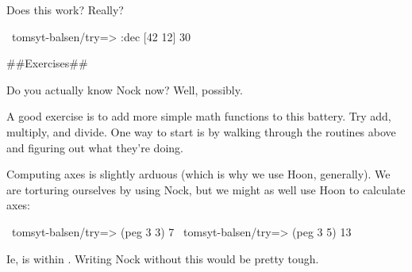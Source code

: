 Does this work?  Really?

\begin{code}
~tomsyt-balsen/try=> :dec [42 12]
30
\end{code}
\#\#Exercises\#\#

Do you actually know Nock now?  Well, possibly.

A good exercise is to add more simple math functions to this
battery.  Try add, multiply, and divide.  One way to start is by
walking through the routines above and figuring out what they're doing.

Computing axes is slightly arduous (which is why we use Hoon,
generally).  We are torturing ourselves by using Nock, but we
might as well use Hoon to calculate axes:

\begin{code}
    ~tomsyt-balsen/try=> (peg 3 3)
    7
    ~tomsyt-balsen/try=> (peg 3 5)
    13
\end{code}
Ie,  is  within .  Writing Nock without this
would be pretty tough.